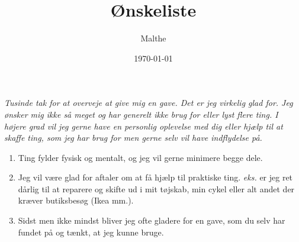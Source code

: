 \documentclass[12pt]{article}
\title{Ønskeliste}
\author{Malthe}
\date{\today}
\begin{document}
\maketitle

\begin{center}
\textit{
Tusinde tak for at overveje at give mig en gave. Det er jeg virkelig glad for. Jeg ønsker mig ikke så meget og har generelt ikke brug for eller lyst flere ting. I højere grad vil jeg gerne have en personlig oplevelse med dig eller hjælp til at skaffe ting, som jeg har brug for men gerne selv vil have indflydelse på.
}
\end{center}

\begin{enumerate}
	\item[\emoji{face-with-monocle}] Ting fylder fysisk og mentalt, og jeg vil gerne minimere begge dele.
	\item[\emoji{sweat-smile}] Jeg vil være glad for aftaler om at få hjælp til praktiske ting. \textit{eks.} er jeg ret dårlig til at reparere og skifte ud i mit tøjskab, min cykel eller alt andet der kræver butiksbesøg (Ikea mm.). 
	\item[\emoji{heart}] Sidst men ikke mindst bliver jeg ofte gladere for en gave, som du selv har fundet på og tænkt, at jeg kunne bruge.
\end{enumerate}
\end{document}
